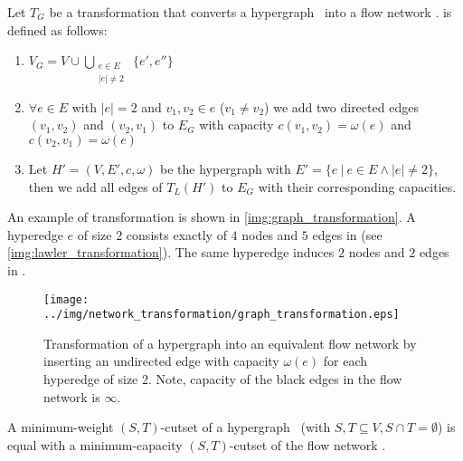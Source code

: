 \begin{definition}
Let $T_G$ be a transformation that converts a hypergraph \HypergraphDef~into 
a flow network .  is defined as follows:
\begin{enumerate}
\item $V_G = V \cup \bigcup\limits_{\substack{e \in E \\ |e| \neq 2}}\ \{e', e''\}$
\item $\forall e \in E$ with $|e| = 2$ and $v_1,v_2 \in e$ ($v_1 \neq v_2$) we add 
      two directed edges $(v_1,v_2)$ and $(v_2,v_1)$ to $E_G$ with capacity $c(v_1,v_2) = \omega(e)$
      and $c(v_2,v_1) = \omega(e)$
\item Let $H' = (V,E',c,\omega)$ be the hypergraph with $E' = \{e\ |\ e \in E \land |e| \neq 2\}$,
      then we add all edges of $T_L(H')$ to $E_G$ with their corresponding capacities.
\end{enumerate} 
\end{definition}

An example of transformation  is shown in \autoref{img:graph_transformation}. A hyperedge
$e$ of size $2$ consists exactly of $4$ nodes and $5$ edges in  (see \autoref{img:lawler_transformation}).
The same hyperedge induces $2$ nodes and $2$ edges in . 
 
\begin{figure}
\centering
\texttt{[image: ../img/network\_transformation/graph\_transformation.eps]}
\caption{Transformation of a hypergraph into an equivalent flow network by inserting 
         an undirected edge with capacity $\omega(e)$ for each hyperedge of size $2$. 
         Note, capacity of the black edges in the flow network is $\infty$.}
\label{img:graph_transformation}
\end{figure}

\begin{theorem}
\label{theorem:st_cutset_equal_graph}
A minimum-weight $(S,T)$-cutset of a hypergraph \HypergraphDef~(with $S,T \subseteq V,
S \cap T = \emptyset$) is equal with a minimum-capacity $(S,T)$-cutset of the
flow network .
\label{theorem:heuer_network}
\end{theorem}

